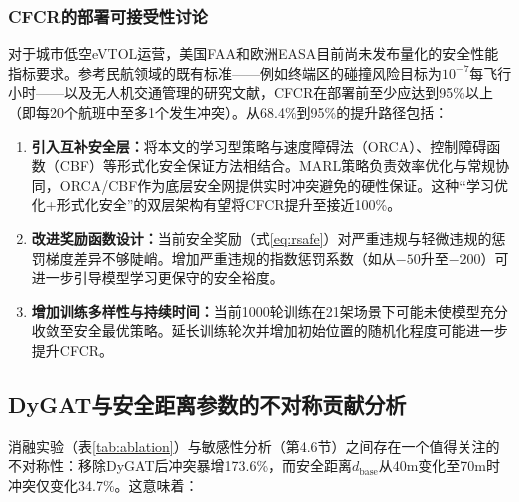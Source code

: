 \documentclass[12pt,a4paper,UTF8]{ctexart}
\begin{document}
\subsubsection{CFCR的部署可接受性讨论}

对于城市低空eVTOL运营，美国FAA和欧洲EASA目前尚未发布量化的安全性能指标要求。参考民航领域的既有标准——例如终端区的碰撞风险目标为$10^{-7}$每飞行小时——以及无人机交通管理的研究文献，CFCR在部署前至少应达到95\%以上（即每20个航班中至多1个发生冲突）。从68.4\%到95\%的提升路径包括：

\begin{enumerate}[label=(\arabic*)]
    \item \textbf{引入互补安全层：}将本文的学习型策略与速度障碍法（ORCA）、控制障碍函数（CBF）等形式化安全保证方法相结合。MARL策略负责效率优化与常规协同，ORCA/CBF作为底层安全网提供实时冲突避免的硬性保证。这种``学习优化+形式化安全''的双层架构有望将CFCR提升至接近100\%。
    \item \textbf{改进奖励函数设计：}当前安全奖励（式\ref{eq:rsafe}）对严重违规与轻微违规的惩罚梯度差异不够陡峭。增加严重违规的指数惩罚系数（如从$-50$升至$-200$）可进一步引导模型学习更保守的安全裕度。
    \item \textbf{增加训练多样性与持续时间：}当前1000轮训练在21架场景下可能未使模型充分收敛至安全最优策略。延长训练轮次并增加初始位置的随机化程度可能进一步提升CFCR。
\end{enumerate}

\subsection{DyGAT与安全距离参数的不对称贡献分析}

消融实验（表\ref{tab:ablation}）与敏感性分析（第4.6节）之间存在一个值得关注的不对称性：移除DyGAT后冲突暴增173.6\%，而安全距离$d_{\text{base}}$从40m变化至70m时冲突仅变化34.7\%。这意味着：
\end{document}
